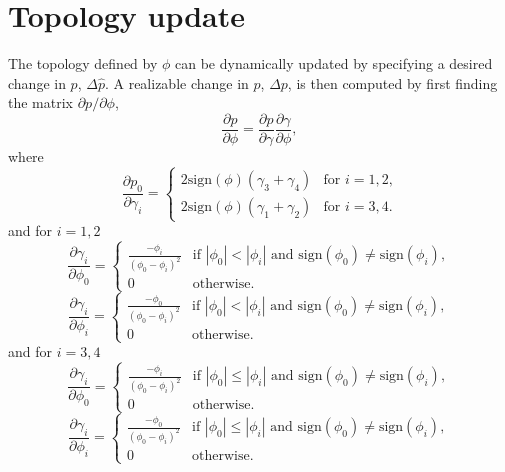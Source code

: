\documentclass{article}
\begin{document}
\section{Topology update}
The topology defined by $\phi$ can be dynamically updated by specifying a desired change in $p$, $\Delta \hat{p}$. A realizable change in $p$, $\Delta p$, is then computed by first finding the matrix $\partial p / \partial \phi$, 
\begin{equation}
    \frac{\partial p}{\partial \phi} = 
    \frac{\partial p}{\partial \gamma} \frac{\partial \gamma}{\partial \phi},
\end{equation}
where
\begin{equation}
    \frac{\partial p_0}{\partial \gamma_i} = 
    \begin{cases}
        2\text{sign}(\phi)(\gamma_3 + \gamma_4) & \text{for $i = 1,2$,} \\
        2\text{sign}(\phi)(\gamma_1 + \gamma_2) & \text{for $i = 3,4$.} 
    \end{cases}
\end{equation}
and for $i = 1,2$
\begin{equation}
    \frac{\partial \gamma_i}{\partial \phi_0} = 
    \begin{cases}
        \frac{-\phi_i}{(\phi_0 - \phi_i)^2} & 
            \text{if } |\phi_0| < |\phi_i| \text{ and } 
            \text{sign}(\phi_0) \ne \text{sign}(\phi_i), \\
        0 & \text{otherwise.}
    \end{cases}
\end{equation}
\begin{equation}
    \frac{\partial \gamma_i}{\partial \phi_i} = 
    \begin{cases}
        \frac{-\phi_0}{(\phi_0 - \phi_i)^2} & 
            \text{if } |\phi_0| < |\phi_i| \text{ and } 
            \text{sign}(\phi_0) \ne \text{sign}(\phi_i), \\
        0 & \text{otherwise.}
    \end{cases}
\end{equation}
and for $i = 3,4$
\begin{equation}
    \frac{\partial \gamma_i}{\partial \phi_0} = 
    \begin{cases}
        \frac{-\phi_i}{(\phi_0 - \phi_i)^2} & 
            \text{if } |\phi_0| \le |\phi_i| \text{ and } 
            \text{sign}(\phi_0) \ne \text{sign}(\phi_i), \\
        0 & \text{otherwise.}
    \end{cases}
\end{equation}
\begin{equation}
    \frac{\partial \gamma_i}{\partial \phi_i} = 
    \begin{cases}
        \frac{-\phi_0}{(\phi_0 - \phi_i)^2} & 
            \text{if } |\phi_0| \le |\phi_i| \text{ and } 
            \text{sign}(\phi_0) \ne \text{sign}(\phi_i), \\
        0 & \text{otherwise.}
    \end{cases}
\end{equation}
\end{document}
